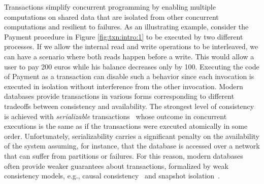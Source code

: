 \begin{figure}
\end{figure}

Transactions simplify concurrent programming by enabling multiple computations on shared data that are isolated from other concurrent computations and resilient to failures.
As an illustrating example, consider the \textsf{Payment} procedure in Figure \ref{fig:txn:intro:1} to be executed by two different processes. If we allow the internal read and write operations to be interleaved, we can have a scenario where both reads happen before a write. This would allow a user to pay 200 euros while his balance decreases only by 100. Executing the code of \textsf{Payment} as a transaction can disable such a behavior since each invocation is executed in isolation without interference from the other invocation. 
Modern databases provide transactions in various forms corresponding to different tradeoffs between consistency and availability. The strongest level of consistency is achieved with \emph{serializable} transactions~\cite{DBLP:journals/jacm/Papadimitriou79b} whose outcome in concurrent executions is the same as if the transactions were executed atomically in some order. Unfortunately, serializability carries a significant penalty on the availability of the system assuming, for instance, that the database is accessed over a network that can suffer from partitions or failures. For this reason, modern databases often provide weaker guarantees about transactions, formalized by weak consistency models, e.g., causal consistency~\cite{DBLP:journals/cacm/Lamport78} and snapshot isolation~\cite{DBLP:conf/sigmod/BerensonBGMOO95}.

